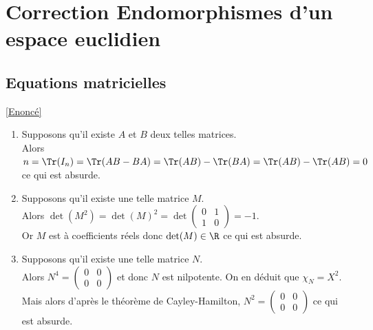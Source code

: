 \documentclass[8pt]{book}
\begin{document}
	
	\newpage
\section{Correction Endomorphismes d'un espace euclidien}
	
	\subsection{Equations matricielles }
	\label{Equations matricielles corrigé}
	\textcolor{blue}{\hyperref[Equations matricielles]{[Enoncé]}}\\
	\begin{enumerate}[leftmargin=*]
		\item Supposons qu'il existe $A$ et $B$ deux telles matrices.\\
		Alors $n=\Tr(I_n)=\Tr(AB-BA)=\Tr(AB)-\Tr(BA)=\Tr(AB)-\Tr(AB)=0$ ce qui est absurde.
		\item Supposons qu'il existe une telle matrice $M$.\\
		Alors $\det(M^2)=\det(M)^2=\det\begin{pmatrix}0&1\\1&0\end{pmatrix}=-1$.\\
		Or $M$ est à coefficients réels donc $\det(M)\in \R$ ce qui est absurde.
		\item Supposons qu'il existe une telle matrice $N$.\\
		Alors $N^4=\begin{pmatrix}0&0\\0&0\end{pmatrix}$ et donc $N$ est nilpotente. On en déduit que $\chi_N=X^2$. Mais alors d'après le théorème de Cayley-Hamilton, $N^2=\begin{pmatrix}0&0\\0&0\end{pmatrix}$ ce qui est absurde.
	\end{enumerate}
	
\end{document}
